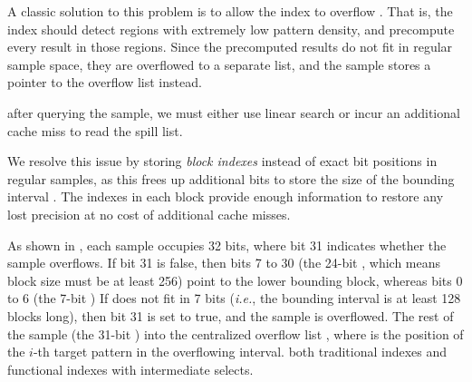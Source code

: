 A classic solution to this problem is to allow the \selectop index to overflow
\cite{ds2i, rank_select_3}. That is, the \selectop index should detect regions
with extremely low pattern density, and precompute every \selectop result in
those regions. Since the precomputed results do not fit in regular sample space,
they are overflowed to a separate list, and the sample stores a pointer to the
overflow list instead.

 after
querying the sample, we must either use linear search or incur an additional
cache miss to read the spill list.

We resolve this issue by storing \emph{block indexes} instead of exact bit
positions in regular samples, as this frees up additional bits to store the size
of the bounding interval . The \rankop indexes in each block
provide enough information to restore any lost precision at no cost of
additional cache misses. 

As shown in , each sample occupies 32 bits, where bit 31
indicates whether the sample overflows. If bit 31 is false, then bits 7 to
30 (the 24-bit \head, which means block size must be at least 256) point to the
lower bounding block, whereas bits 0 to 6 (the 7-bit \dist)   If \dist does not fit in 7 bits
(\textit{i.e.}, the bounding interval is at least 128 blocks long), then bit 31
is set to true, and the sample is overflowed. The rest of the sample (the 31-bit
\spillptr)  into the centralized overflow list \spilllist, where
\texttt{\spilllistnospace[\spillptr + i]} is the position of the $i$-th target pattern
in the overflowing interval.  both traditional \selectop indexes and functional indexes with intermediate selects.

